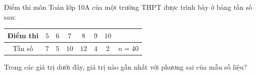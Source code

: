 \begin{ex}
Điểm thi môn Toán lớp 10A của một trường THPT được trình bày ở bảng tần số sau:
\begin{center}
\begin{tabular}{|c|c|c|c|c|c|c|c|}\hline
Điểm thi & $5$ & $6$ & $7$ & $8$ & $9$ & $10$ & \\\hline
Tần số & $7$ & $5$ & $10$ & $12$ & $4$ & $2$ & $n=40$\\\hline
\end{tabular}
\end{center}
Trong các giá trị dưới đây, giá trị nào gần nhất với phương sai của mẫu số liệu?
\end{ex}
